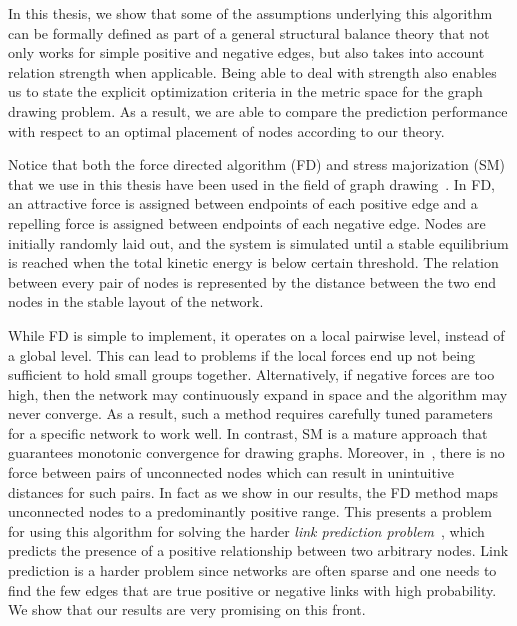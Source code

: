 In this thesis, we show that some of the assumptions underlying this
algorithm can be formally defined as part of a general structural
balance theory that not only works for simple positive and negative
edges, but also takes into account relation strength when
applicable. Being able to deal with strength also enables us to state
the explicit optimization criteria in the metric space for the graph
drawing problem. As a result, we are able to compare the prediction
performance with respect to an optimal placement of nodes according to
our theory.

Notice that both the force directed algorithm (FD) and stress
majorization (SM) that we use in this thesis have been used in the
field of graph drawing~\cite{Gansner:05}. In FD, an attractive force
is assigned between endpoints of each positive edge and a repelling
force is assigned between endpoints of each negative edge. Nodes are
initially randomly laid out, and the system is simulated until a
stable equilibrium is reached when the total kinetic energy is below
certain threshold. The relation between every pair of nodes is
represented by the distance between the two end nodes in the stable
layout of the network.

While FD is simple to implement, it operates on a local pairwise
level, instead of a global level. This can lead to problems if the
local forces end up not being sufficient to hold small groups
together. Alternatively, if negative forces are too high, then the
network may continuously expand in space and the algorithm may never
converge. As a result, such a method requires carefully tuned
parameters for a specific network to work well.  In contrast, SM is a
mature approach that guarantees monotonic convergence for drawing
graphs. Moreover, in~\cite{golbeck:distrust2011}, there is no force
between pairs of unconnected nodes which can result in unintuitive
distances for such pairs. In fact as we show in our results, the FD
method maps unconnected nodes to a predominantly positive range. This
presents a problem for using this algorithm for solving the harder
{\it link prediction problem}~\cite{Kleinberg:03}, which predicts the presence of a positive relationship between two arbitrary nodes. Link prediction is a harder problem since networks are often sparse and one needs to find
the few edges that are true positive or negative links with high
probability. We show that our results are very promising on this
front.

